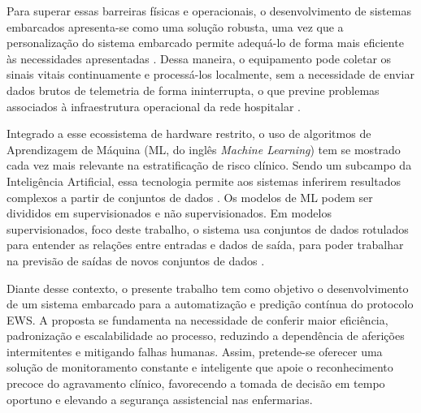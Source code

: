 Para superar essas barreiras físicas e operacionais, o desenvolvimento de sistemas embarcados apresenta-se como uma solução robusta, uma vez que a personalização do sistema embarcado permite adequá-lo de forma mais eficiente às necessidades apresentadas \cite{embedesSystem}. Dessa maneira, o equipamento pode coletar os sinais vitais continuamente e processá-los localmente, sem a necessidade de enviar dados brutos de telemetria de forma ininterrupta, o que previne problemas associados à infraestrutura operacional da rede hospitalar \cite{rancea2024edge}.


Integrado a esse ecossistema de hardware restrito, o uso de algoritmos de Aprendizagem de Máquina (ML, do inglês \textit{Machine Learning}) tem se mostrado cada vez mais relevante na estratificação de risco clínico. Sendo um subcampo da Inteligência Artificial, essa tecnologia permite aos sistemas inferirem resultados complexos a partir de conjuntos de dados \cite{ibmMl}. Os modelos de ML podem ser divididos em supervisionados e não supervisionados. Em modelos supervisionados, foco deste trabalho, o sistema usa conjuntos de dados rotulados para entender as relações entre entradas e dados de saída, para poder trabalhar na previsão de saídas de novos conjuntos de dados \cite{ibmSupervised}.

Diante desse contexto, o presente trabalho tem como objetivo o desenvolvimento de um sistema embarcado para a automatização e predição contínua do protocolo EWS. A proposta se fundamenta na necessidade de conferir maior eficiência, padronização e escalabilidade ao processo, reduzindo a dependência de aferições intermitentes e mitigando falhas humanas. Assim, pretende-se oferecer uma solução de monitoramento constante e inteligente que apoie o reconhecimento precoce do agravamento clínico, favorecendo a tomada de decisão em tempo oportuno e elevando a segurança assistencial nas enfermarias.

